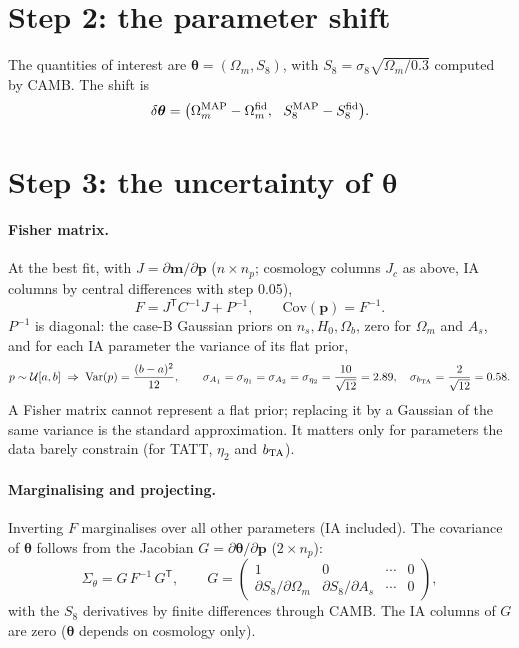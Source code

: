 \documentclass[11pt]{article}
\newcommand{\vm}{\bm{m}}
\newcommand{\vp}{\bm{p}}
\newcommand{\vth}{\bm{\theta}}
\newcommand{\tp}{^{\mathsf T}}
\begin{document}
\section{Step 2: the parameter shift}

The quantities of interest are $\vth = (\Omega_m, S_8)$, with
$S_8 = \sigma_8\sqrt{\Omega_m/0.3}$ computed by CAMB. The shift is
\begin{equation}
\delta\vth = \big(\Omega_m^{\rm MAP} - \Omega_m^{\rm fid},\ \ S_8^{\rm MAP} - S_8^{\rm fid}\big).
\end{equation}

\section{Step 3: the uncertainty of \texorpdfstring{$\vth$}{(Omega_m, S8)}}

\paragraph{Fisher matrix.} At the best fit, with $J = \partial\vm/\partial\vp$
($n \times n_p$; cosmology columns $J_c$ as above, IA columns by central
differences with step 0.05),
\begin{equation}
F = J\tp C^{-1} J + P^{-1},
\qquad \mathrm{Cov}(\vp) = F^{-1}.
\label{eq:fisher}
\end{equation}
$P^{-1}$ is diagonal: the case-B Gaussian priors on $n_s, H_0, \Omega_b$,
zero for $\Omega_m$ and $A_s$, and for each IA parameter the variance of its
flat prior,
\begin{equation}
p \sim \mathcal{U}[a, b] \;\Rightarrow\; \mathrm{Var}(p) = \frac{(b-a)^2}{12},
\qquad \sigma_{A_1} = \sigma_{\eta_1} = \sigma_{A_2} = \sigma_{\eta_2} = \frac{10}{\sqrt{12}} = 2.89,\quad
\sigma_{b_{\rm TA}} = \frac{2}{\sqrt{12}} = 0.58 .
\label{eq:flatvar}
\end{equation}
A Fisher matrix cannot represent a flat prior; replacing it by a Gaussian of
the same variance is the standard approximation. It matters only for
parameters the data barely constrain (for TATT, $\eta_2$ and $b_{\rm TA}$).

\paragraph{Marginalising and projecting.} Inverting $F$ marginalises over all
other parameters (IA included). The covariance of $\vth$ follows from the
Jacobian $G = \partial\vth/\partial\vp$ ($2 \times n_p$):
\begin{equation}
\Sigma_\theta = G\,F^{-1}\,G\tp,\qquad
G = \begin{pmatrix} 1 & 0 & \cdots & 0 \\ \partial S_8/\partial\Omega_m & \partial S_8/\partial A_s & \cdots & 0 \end{pmatrix},
\end{equation}
with the $S_8$ derivatives by finite differences through CAMB. The IA columns
of $G$ are zero ($\vth$ depends on cosmology only).
\end{document}
